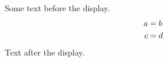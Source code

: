 \documentclass[12pt]{article}
\begin{document}
Some text before the display.
\begin{align} a &= b \notag \\ c &= d \end{align}
Text after the display.
\end{document}
